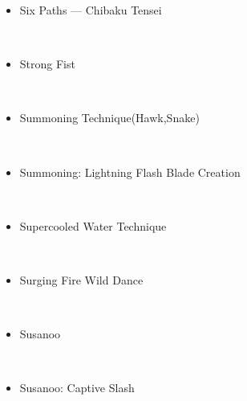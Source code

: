 \documentclass[a4paper,12pt]{article}
\begin{document}
\begin{itemize}
\item Six Paths — Chibaku Tensei
\end{itemize}\\ \par \vspace{0.5cm}

\begin{itemize}
\item Strong Fist
\end{itemize}\\ \par \vspace{0.5cm}

\begin{itemize}
\item Summoning Technique(Hawk,Snake)
\end{itemize}\\ \par \vspace{0.5cm}

\begin{itemize}
\item Summoning: Lightning Flash Blade Creation
\end{itemize}\\ \par \vspace{0.5cm}

\begin{itemize}
\item Supercooled Water Technique
\end{itemize}\\ \par \vspace{0.5cm}

\begin{itemize}
\item Surging Fire Wild Dance
\end{itemize}\\ \par \vspace{0.5cm}

\begin{itemize}
\item Susanoo
\end{itemize}\\ \par \vspace{0.5cm}

\begin{itemize}
\item Susanoo: Captive Slash
\end{itemize}\\ \par \vspace{0.5cm}
\end{document}
